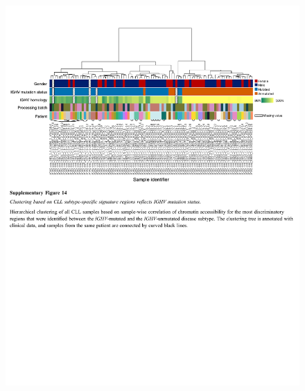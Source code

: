 \documentclass[10pt,]{article}
\begin{document}
\begin{figure}
\centering
\includegraphics[width=1.000\hsize]{figures/Supplementary_Information_14.pdf}
\end{figure}
\clearpage
\end{document}
